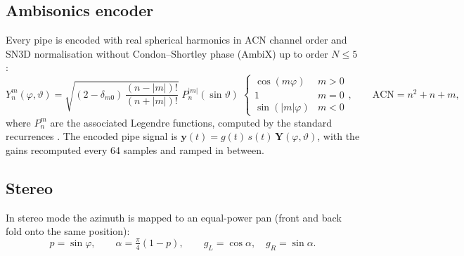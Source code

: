 \documentclass[11pt,a4paper,parskip=half,DIV=11,toc=bibliography]{scrartcl}
\begin{document}
\subsection{Ambisonics encoder}
Every pipe is encoded with real spherical harmonics in ACN channel order and SN3D normalisation without
Condon--Shortley phase (AmbiX) up to order $N\le5$:
\begin{equation}
  Y_n^m(\varphi,\vartheta) = \sqrt{(2-\delta_{m0})\,\frac{(n-|m|)!}{(n+|m|)!}}\;
  P_n^{|m|}(\sin\vartheta)\;
  \begin{cases}\cos(m\varphi) & m>0\\ 1 & m=0\\ \sin(|m|\varphi) & m<0\end{cases},
  \qquad \text{ACN} = n^2+n+m,
\end{equation}
where $P_n^m$ are the associated Legendre functions, computed by the standard recurrences
\citep{zotter2019}. The encoded pipe signal is $\mathbf{y}(t) = g(t)\,s(t)\,\mathbf{Y}(\varphi,\vartheta)$,
with the gains recomputed every 64 samples and ramped in between.

\subsection{Stereo}
In stereo mode the azimuth is mapped to an equal-power pan (front and back fold onto the same position):
\begin{equation}
  p = \sin\varphi,\qquad \alpha = \tfrac{\pi}{4}(1-p),\qquad g_L=\cos\alpha,\quad g_R=\sin\alpha .
\end{equation}
\end{document}
